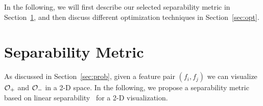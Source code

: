 In the following, we will first describe our selected separability metric in Section~\ref{sec:metric}, and then discuss different optimization techniques in Section~\ref{sec:opt}.



\section{Separability Metric}\label{sec:metric}

As discussed in Section~\ref{sec:prob}, given a feature pair $(f_i,f_j)$ we can visualize $\oo_+$ and $\oo_-$ in a 2-D space. In the following, we propose a separability metric based on linear separability~\cite{shamos1975geometric} for a 2-D visualization. 

